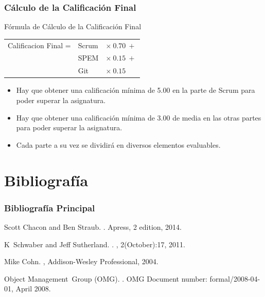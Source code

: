 \documentclass[animated,a4paper,slidestop,xcolor=pst,blue]{beamer}
\begin{document}
\begin{frame}[c]
	\frametitle{Cálculo de la Calificación Final}
	\begin{block}{Fórmula de Cálculo de la Calificación Final}
		\begin{tabular}{lll}
			Calificacion Final = & Scrum & $\times \ 0.70 \ + $ \\
                                 & SPEM  & $\times \ 0.15 \ + $ \\
                                 & Git   & $\times \ 0.15 \   $ \\
		\end{tabular}
	\end{block}
	\begin{itemize}
		\item<2-> Hay que obtener una calificación mínima de 5.00 en la parte de Scrum para poder superar la asignatura.
		\item<3-> Hay que obtener una calificación mínima de 3.00 de media en las otras partes para poder superar la asignatura.
        \item<4-> Cada parte a su vez se dividirá en diversos elementos evaluables.
	\end{itemize}
\end{frame}

\section{Bibliografía}

\begin{frame}
    \frametitle{Bibliografía Principal}
    \begin{thebibliography}{1}

Scott Chacon and Ben Straub.
.
\newblock Apress, 2 edition, 2014.

K~Schwaber and Jeff Sutherland.
.
, 2(October):17, 2011.

Mike Cohn.
,
\newblock Addison-Wesley Professional, 2004.

\bibitem{}
Object Management~Group (OMG).
.
\newblock OMG Document number: formal/2008-04-01, April 2008.
\end{thebibliography}
\end{frame}
\end{document}
